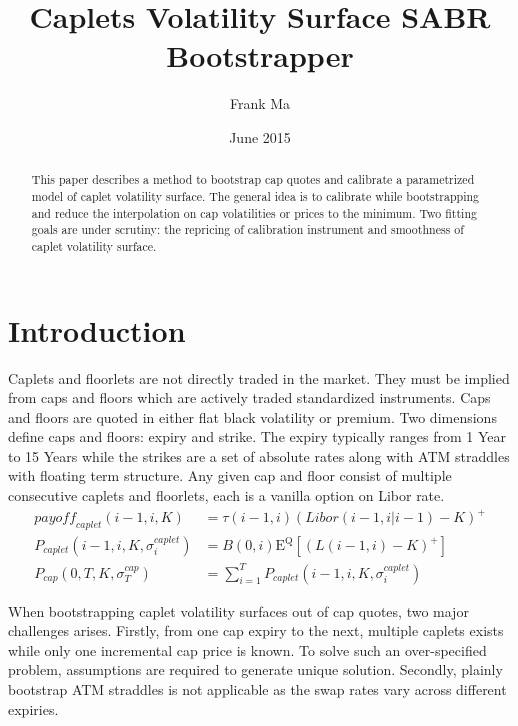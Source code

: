 \documentclass{article}
\title{Caplets Volatility Surface SABR Bootstrapper}
\author{Frank Ma}
\date{June 2015}
\begin{document}
\maketitle

\begin{abstract}

This paper describes a method to bootstrap cap quotes and calibrate a parametrized model of caplet volatility surface.
The general idea is to calibrate while bootstrapping and reduce the interpolation on cap volatilities or prices to the minimum.
Two fitting goals are under scrutiny: the repricing of calibration instrument and smoothness of caplet volatility surface.

\end{abstract}

\section{Introduction}

Caplets and floorlets are not directly traded in the market.
They must be implied from caps and floors which are actively traded standardized instruments.
Caps and floors are quoted in either flat black volatility or premium.
Two dimensions define caps and floors: expiry and strike.
The expiry typically ranges from 1 Year to 15 Years while the strikes are a set of absolute rates along with ATM straddles with floating term structure.
Any given cap and floor consist of multiple consecutive caplets and floorlets, each is a vanilla option on Libor rate.
\begin{align}
    {payoff}_{caplet}\left(i - 1, i, K\right) &= \tau\left(i - 1, i\right) \left(Libor\left(i - 1, i|{i - 1}\right) - K\right)^{+} \\
    P_{caplet} \left(i-1, i, K, \sigma_i^{caplet}\right) &= B{(0, i)} \mathrm{E}^{\mathrm{Q}} \left[{(L(i - 1, i) - K)}^{+}\right] \\
    P_{cap}\left(0, T, K, \sigma_T^{cap}\right) &= \sum_{i=1}^T{P_{caplet}\left(i - 1, i, K, \sigma_i^{caplet}\right)}
\end{align}

When bootstrapping caplet volatility surfaces out of cap quotes, two major challenges arises.
Firstly, from one cap expiry to the next, multiple caplets exists while only one incremental cap price is known.
To solve such an over-specified problem, assumptions are required to generate unique solution.
Secondly, plainly bootstrap ATM straddles is not applicable as the swap rates vary across different expiries.
\end{document}
